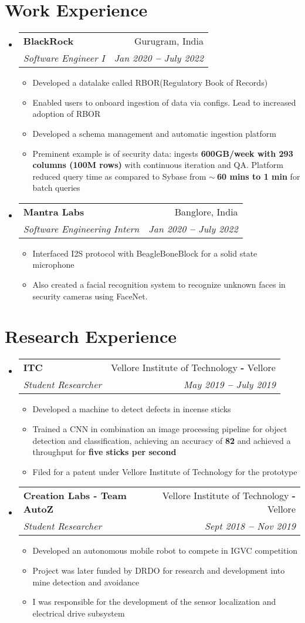 \documentclass[10.5pt]{article}
\makeatletter
\newcommand{\resumeItem}[1]{
  \item\small{
    {#1 \vspace{-2pt}}
  }
}
\newcommand{\resumeSubheading}[4]{
  \vspace{-0.5pt}\item
    \begin{tabular*}{0.97\textwidth}[t]{l@{\extracolsep{\fill}}r}
      \textbf{#1} & #2 \\
      \textit{\small#3} & \textit{\small #4} \\
    \end{tabular*}\vspace{-7pt}
}
\newcommand{\resumeSubHeadingListStart}{\begin{itemize}[leftmargin=0.15in, label={}]}
\newcommand{\resumeSubHeadingListEnd}{\end{itemize}}
\newcommand{\resumeItemListStart}{\begin{itemize}}
\newcommand{\resumeItemListEnd}{\end{itemize}\vspace{-6pt}}
\makeatother
\begin{document}
\section{Work Experience}
  \vspace{1pt}
  \resumeSubHeadingListStart
  \resumeSubheading
      {BlackRock}{Gurugram, India}
      {Software Engineer I}{Jan 2020 \textbf{--} July 2022}
        \resumeItemListStart
            \resumeItem{Developed a datalake called RBOR(Regulatory Book of Records) }
            \resumeItem{Enabled users to onboard ingestion of data via configs. Lead to increased adoption of RBOR}
            \resumeItem{Developed a schema management and automatic ingestion platform}
            \resumeItem{Preminent example is of security data: ingests \textbf{600GB/week with 293 columns (100M rows)} with continuous iteration and QA. Platform reduced query time as compared to Sybase from \textbf{$\sim{~}$60 mins to 1 min} for batch queries}  
        \resumeItemListEnd 
 
      \resumeSubheading
        {Mantra Labs}{Banglore, India}
        {Software Engineering Intern}{Jan 2020 \textbf{--} July 2022}
          \resumeItemListStart
              \resumeItem{Interfaced I2S protocol with BeagleBoneBlock for a solid state microphone}
              \resumeItem{Also created a facial recognition system to recognize unknown faces in security cameras using FaceNet.}
          \resumeItemListEnd 
 
  \resumeSubHeadingListEnd


\section{Research Experience}
  \resumeSubHeadingListStart
    \resumeSubheading
      {ITC}{ Vellore Institute of Technology  \textbf{-} Vellore}
      {Student Researcher}{May 2019 \textbf{--}  July 2019}
        \resumeItemListStart
            \resumeItem{Developed a machine to detect defects in incense sticks}
            \resumeItem{Trained a CNN in combination an image processing pipeline for object detection and classification, achieving an accuracy of \textbf{82\symbol{\%}} and achieved a throughput for \textbf{five sticks per second} }
            \resumeItem{Filed for a patent under Vellore Institute of Technology for the prototype}
            \resumeItemListEnd
    \resumeSubheading
      {Creation Labs - Team AutoZ}{Vellore Institute of Technology \textbf{-} Vellore}
      {Student Researcher}{Sept 2018 \textbf{--}  Nov 2019}
        \resumeItemListStart
            \resumeItem{Developed an autonomous mobile robot to compete in IGVC competition}
            \resumeItem{Project was later funded by DRDO for research and development into mine detection and avoidance}
            \resumeItem{I was responsible for the development of the sensor localization and electrical drive subsystem}
          \resumeItemListEnd
  \resumeSubHeadingListEnd
\end{document}

